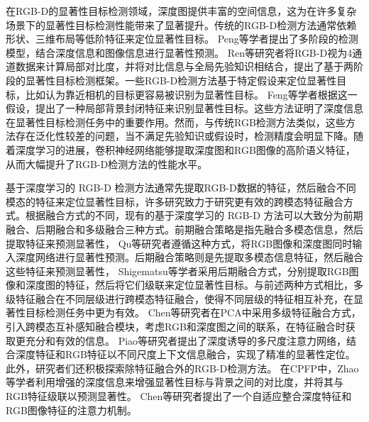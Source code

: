 

在RGB-D的显著性目标检测领域，深度图提供丰富的空间信息，这为在许多复杂场景下的显著性目标检测性能带来了显著提升。传统的RGB-D检测方法通常依赖形状、三维布局等低阶特征来定位显著性目标。
Peng等学者提出了多阶段的检测模型，结合深度信息和图像信息进行显著性预测。
Ren等研究者将RGB-D视为4通道数据来计算局部对比度，并将对比信息与全局先验知识相结合，提出了基于两阶段的显著性目标检测框架。一些RGB-D检测方法基于特定假设来定位显著性目标，比如认为靠近相机的目标更容易被识别为显著性目标。
Feng等学者根据这一假设，提出了一种局部背景封闭特征来识别显著性目标。这些方法证明了深度信息在显著性目标检测任务中的重要作用。然而，与传统RGB检测方法类似，这些方法存在泛化性较差的问题，当不满足先验知识或假设时，检测精度会明显下降。随着深度学习的进展，卷积神经网络能够提取深度图和RGB图像的高阶语义特征，从而大幅提升了RGB-D检测方法的性能水平。


基于深度学习的 RGB-D 检测方法通常先提取RGB-D数据的特征，然后融合不同模态的特征来定位显著性目标，许多研究致力于研究更有效的跨模态特征融合方式。根据融合方式的不同，现有的基于深度学习的 RGB-D 方法可以大致分为前期融合、后期融合和多级融合三种方式。前期融合策略是指先融合多模态信息，然后提取特征来预测显著性，
Qu等研究者遵循这种方式，将RGB图像和深度图同时输入深度网络进行显著性预测。后期融合策略则是先提取多模态信息特征，然后融合这些特征来预测显著性，
Shigematsu等学者采用后期融合方式，分别提取RGB图像和深度图的特征，然后将它们级联来定位显著性目标。与前述两种方式相比，多级特征融合在不同层级进行跨模态特征融合，使得不同层级的特征相互补充，在显著性目标检测任务中更为有效。
Chen等研究者在PCA中采用多级特征融合方式，引入跨模态互补感知融合模块，考虑RGB和深度图之间的联系，在特征融合时获取更充分和有效的信息。
Piao等研究者提出了深度诱导的多尺度注意力网络，结合深度特征和RGB特征以不同尺度上下文信息融合，实现了精准的显著性定位。此外，研究者们还积极探索除特征融合外的RGB-D检测方法。
在CPFP中，Zhao等学者利用增强的深度信息来增强显著性目标与背景之间的对比度，并将其与RGB特征级联以预测显著性。
Chen等研究者提出了一个自适应整合深度特征和RGB图像特征的注意力机制。









